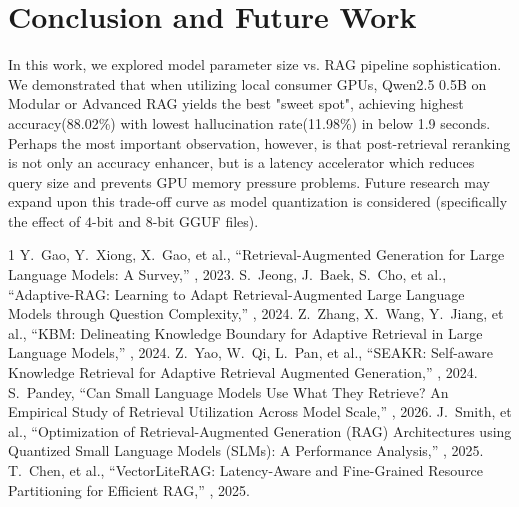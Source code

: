 \documentclass[conference]{IEEEtran}
\begin{document}
\section{Conclusion and Future Work}
In this work, we explored model parameter size vs. RAG pipeline sophistication. We demonstrated that when utilizing local consumer GPUs, Qwen2.5 0.5B on Modular or Advanced RAG yields the best "sweet spot", achieving highest accuracy(88.02\%) with lowest hallucination rate(11.98\%) in below 1.9 seconds. 
Perhaps the most important observation, however, is that post-retrieval reranking is not only an accuracy enhancer, but is a latency accelerator which reduces query size and prevents GPU memory pressure problems. Future research may expand upon this trade-off curve as model quantization is considered (specifically the effect of $4$-bit and $8$-bit GGUF files).

\begin{thebibliography}{1}
Y.~Gao, Y.~Xiong, X.~Gao, et al., ``Retrieval-Augmented Generation for Large Language Models: A Survey,'' , 2023.
S.~Jeong, J.~Baek, S.~Cho, et al., ``Adaptive-RAG: Learning to Adapt Retrieval-Augmented Large Language Models through Question Complexity,'' , 2024.
Z.~Zhang, X.~Wang, Y.~Jiang, et al., ``KBM: Delineating Knowledge Boundary for Adaptive Retrieval in Large Language Models,'' , 2024.
Z.~Yao, W.~Qi, L.~Pan, et al., ``SEAKR: Self-aware Knowledge Retrieval for Adaptive Retrieval Augmented Generation,'' , 2024.
S.~Pandey, ``Can Small Language Models Use What They Retrieve? An Empirical Study of Retrieval Utilization Across Model Scale,'' , 2026.
J.~Smith, et al., ``Optimization of Retrieval-Augmented Generation (RAG) Architectures using Quantized Small Language Models (SLMs): A Performance Analysis,'' , 2025.
T.~Chen, et al., ``VectorLiteRAG: Latency-Aware and Fine-Grained Resource Partitioning for Efficient RAG,'' , 2025.
\end{thebibliography}
\end{document}
